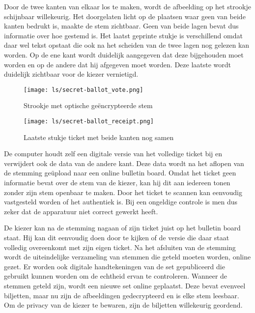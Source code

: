 \npar Door de twee kanten van elkaar los te maken, wordt de afbeelding op het strookje schijnbaar willekeurig. Het doorgelaten licht op de plaatsen waar geen van beide kanten bedrukt is, maakte de stem zichtbaar. Geen van beide lagen bevat dus informatie over hoe gestemd is. Het laatst geprinte stukje is verschillend omdat daar wel tekst opstaat die ook na het scheiden van de twee lagen nog gelezen kan worden. Op de ene kant wordt duidelijk aangegeven dat deze bijgehouden moet worden en op de andere dat hij afgegeven moet worden. Deze laatste wordt duidelijk zichtbaar voor de kiezer vernietigd.

\begin{figure}
  \centering
  \texttt{[image: ls/secret-ballot\_vote.png]}
  \caption[Strookje met optisch ge\"encrypteerde stem]{Strookje met optische ge\"encrypteerde stem~\cite{chaum_secret_ballot}}
  \label{fig:ls:secret_ballot_vote}
\end{figure}

\begin{figure}
  \centering
  \texttt{[image: ls/secret-ballot\_receipt.png]}
  \caption[Laatste stukje ticket met beide kanten nog samen]{Laatste stukje ticket met beide kanten nog samen~\cite{chaum_secret_ballot}}
  \label{fig:ls:secret_ballot_receipt}
\end{figure}

\npar De computer houdt zelf een digitale versie van het volledige ticket bij en verwijdert ook de data van de andere kant. Deze data wordt na het aflopen van de stemming ge\"upload naar een online bulletin board. Omdat het ticket geen informatie bevat over de stem van de kiezer, kan hij dit aan iedereen tonen zonder zijn stem openbaar te maken. Door het ticket te scannen kan eenvoudig vastgesteld worden of het authentiek is. Bij een ongeldige controle is men dus zeker dat de apparatuur niet correct gewerkt heeft.

\npar De kiezer kan na de stemming nagaan of zijn ticket juist op het bulletin board staat. Hij kan dit eenvoudig doen door te kijken of de versie die daar staat volledig overeenkomt met zijn eigen ticket. Na het afsluiten van de stemming wordt de uiteindelijke verzameling van stemmen die geteld moeten worden, online gezet. Er worden ook digitale handtekeningen van de set gepubliceerd die gebruikt kunnen worden om de echtheid ervan te controleren. Wanneer de stemmen geteld zijn, wordt een nieuwe set online geplaatst. Deze bevat evenveel biljetten, maar nu zijn de afbeeldingen gedecrypteerd en is elke stem leesbaar. Om de privacy van de kiezer te bewaren, zijn de biljetten willekeurig geordend.

